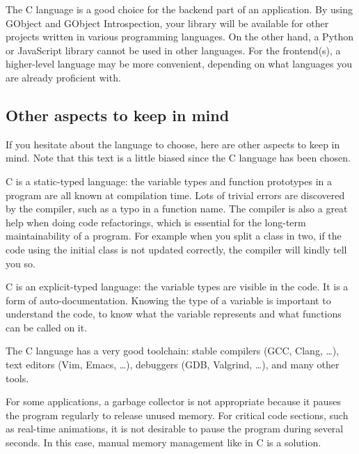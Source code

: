 The C language is a good choice for the backend part of an application. By using GObject and GObject Introspection, your library will be available for other projects written in various programming languages. On the other hand, a Python or JavaScript library cannot be used in other languages. For the frontend(s), a higher-level language may be more convenient, depending on what languages you are already proficient with.

\subsection{Other aspects to keep in mind}
If you hesitate about the language to choose, here are other aspects to keep in mind. Note that this text is a little biased since the C language has been chosen.

C is a static-typed language: the variable types and function prototypes in a program are all known at compilation time. Lots of trivial errors are discovered by the compiler, such as a typo in a function name. The compiler is also a great help when doing code refactorings, which is essential for the long-term maintainability of a program. For example when you split a class in two, if the code using the initial class is not updated correctly, the compiler will kindly tell you so.

C is an explicit-typed language: the variable types are visible in the code. It is a form of auto-documentation. Knowing the type of a variable is important to understand the code, to know what the variable represents and what functions can be called on it.

The C language has a very good toolchain: stable compilers (GCC, Clang, …), text editors (Vim, Emacs, …), debuggers (GDB, Valgrind, …), and many other tools.

For some applications, a garbage collector is not appropriate because it pauses the program regularly to release unused memory. For critical code sections, such as real-time animations, it is not desirable to pause the program during several seconds. In this case, manual memory management like in C is a solution.

